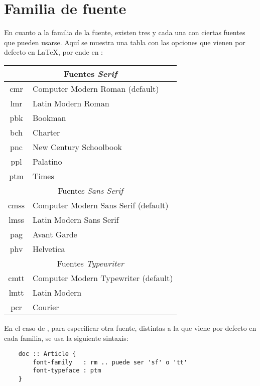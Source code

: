 \documentclass[12pt,letterpaper,titlepage,oneside,openright]{book}
\newcommand{\OhTeX}{%
    \makebox[0.76em][c]{O}%
    \makebox[0.25em][c]{%
        \raisebox{0.14em}[0em][0em]{%
            \fontsize{0.5em}{0cm}%
                \selectfont H%
        }%
    }%
    \makebox[1.35em][c]{\TeX}%
}
\newcommand{\latex}{\LaTeX\xspace}
\newcommand{\ohtex}{\OhTeX\xspace}
\begin{document}
\section{Familia de fuente}

En cuanto a la familia de la fuente, existen tres y cada una con ciertas fuentes que pueden usarse. Aquí se muestra una tabla con las opciones que vienen por defecto en \latex, por ende en \ohtex:

\begin{center}
\begin{tabular}{ c l }
    \hline
    \multicolumn{2}{c}{Fuentes \textit{Serif}} \\
    \hline
    cmr & Computer Modern Roman (default) \\
    lmr & Latin Modern Roman \\
    pbk & Bookman \\
    bch & Charter \\
    pnc & New Century Schoolbook \\
    ppl & Palatino \\
    ptm & Times \\
    \hline
    \multicolumn{2}{c}{Fuentes \textit{Sans Serif}} \\
    \hline
    cmss & Computer Modern Sans Serif (default) \\
    lmss & Latin Modern Sans Serif \\
    pag  & Avant Garde \\
    phv  & Helvetica \\
    \hline
    \multicolumn{2}{c}{Fuentes \textit{Typewriter}} \\
    \hline
    cmtt & Computer Modern Typewriter (default) \\
    lmtt & Latin Modern \\
    pcr  & Courier \\
    \hline
\end{tabular}
\end{center}

En el caso de \ohtex, para especificar otra fuente, distintas a la que viene por defecto en cada familia, se usa la siguiente sintaxis:

\begin{center}
\begin{minipage}{\linewidth}
\begin{lstlisting}
    doc :: Article {
        font-family   : rm .. puede ser 'sf' o 'tt'
        font-typeface : ptm
    }
\end{lstlisting}
\end{minipage}
\end{center}
\end{document}
